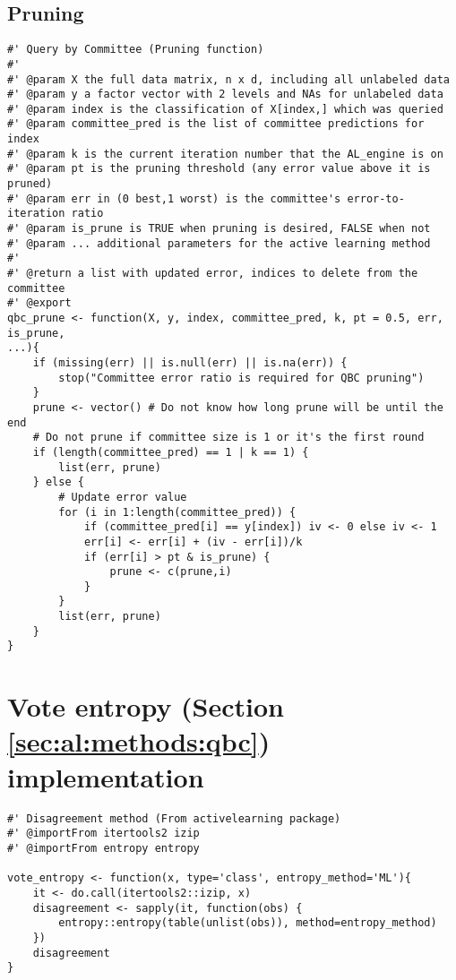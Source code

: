 \subsection{Pruning}
{
\begin{lstlisting}
#' Query by Committee (Pruning function)
#'
#' @param X the full data matrix, n x d, including all unlabeled data
#' @param y a factor vector with 2 levels and NAs for unlabeled data
#' @param index is the classification of X[index,] which was queried
#' @param committee_pred is the list of committee predictions for index
#' @param k is the current iteration number that the AL_engine is on
#' @param pt is the pruning threshold (any error value above it is pruned)
#' @param err in (0 best,1 worst) is the committee's error-to-iteration ratio
#' @param is_prune is TRUE when pruning is desired, FALSE when not
#' @param ... additional parameters for the active learning method
#'
#' @return a list with updated error, indices to delete from the committee
#' @export
qbc_prune <- function(X, y, index, committee_pred, k, pt = 0.5, err, is_prune, 
...){
	if (missing(err) || is.null(err) || is.na(err)) {
		stop("Committee error ratio is required for QBC pruning")
	}
	prune <- vector() # Do not know how long prune will be until the end
	# Do not prune if committee size is 1 or it's the first round
	if (length(committee_pred) == 1 | k == 1) {
		list(err, prune)
	} else {
		# Update error value
		for (i in 1:length(committee_pred)) {
			if (committee_pred[i] == y[index]) iv <- 0 else iv <- 1
			err[i] <- err[i] + (iv - err[i])/k
			if (err[i] > pt & is_prune) {
				prune <- c(prune,i)
			}
		}
		list(err, prune)
	}
}
\end{lstlisting}
}

\section{Vote entropy (Section \ref{sec:al:methods:qbc}) implementation}
\label{sec:appendicies:al:entropy}
{
	\begin{lstlisting}
#' Disagreement method (From activelearning package)
#' @importFrom itertools2 izip
#' @importFrom entropy entropy

vote_entropy <- function(x, type='class', entropy_method='ML'){
	it <- do.call(itertools2::izip, x)
	disagreement <- sapply(it, function(obs) {
		entropy::entropy(table(unlist(obs)), method=entropy_method)
	})
	disagreement
}
\end{lstlisting}
}



